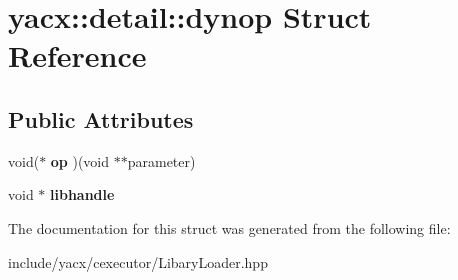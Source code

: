\hypertarget{structyacx_1_1detail_1_1dynop}{}\section{yacx\+:\+:detail\+:\+:dynop Struct Reference}
\label{structyacx_1_1detail_1_1dynop}
\subsection*{Public Attributes}
\begin{DoxyCompactItemize}
\item 
\mbox{\label{structyacx_1_1detail_1_1dynop_a369931b9091d6f11b403e59edc9deb02}} 
void($\ast$ {\bfseries op} )(void $\ast$$\ast$parameter)
\item 
\mbox{\label{structyacx_1_1detail_1_1dynop_ab754a462a362da39f69a710e34851937}} 
void $\ast$ {\bfseries libhandle}
\end{DoxyCompactItemize}


The documentation for this struct was generated from the following file\+:\begin{DoxyCompactItemize}
\item 
include/yacx/cexecutor/Libary\+Loader.\+hpp\end{DoxyCompactItemize}

